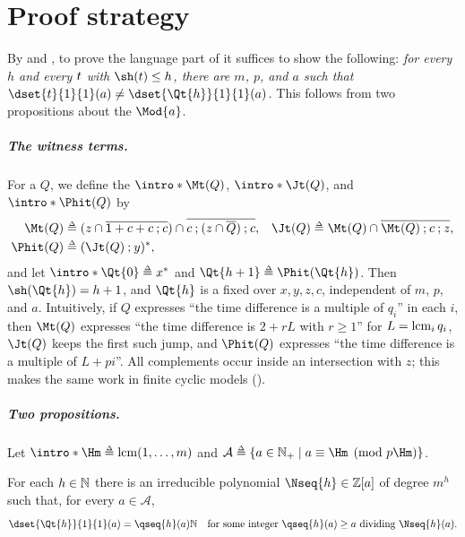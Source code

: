 \section{Proof strategy}\label{section: strategy}

By  and , to prove the language part of  it suffices to show the following:
\emph{for every $h$ and every  $\term$ with $\sh(\term) \le h$, there are $m$, $p$, and $a$ such that $\dset{\term}{1}{1}(a) \neq \dset{\Qt{h}}{1}{1}(a)$.}
This follows from two propositions about the  $\Mod{a}$.

\subparagraph*{The witness terms.}
\AP For a  $Q$, we define the  $\intro*\Mt(Q)$, $\intro*\Jt(Q)$, and $\intro*\Phit(Q)$ by
\begin{align*}
    \Mt(Q) &\defeq (\Zthree) \inter \com{c \compo (z \inter \com{Q}) \compo c}, &
    \Jt(Q) &\defeq \Mt(Q) \inter \com{\Mt(Q) \compo c \compo z}, \\
    \Phit(Q) &\defeq (\Jt(Q) \compo y)^{*},
\end{align*}
\AP and let $\intro*\Qt{0} \defeq x^{*}$ and $\Qt{h+1} \defeq \Phit(\Qt{h})$.
Then $\sh(\Qt{h}) = h + 1$, and $\Qt{h}$ is a fixed  over $x, y, z, c$, independent of $m$, $p$, and $a$.
Intuitively, if $Q$ expresses ``the time difference is a multiple of $q_i$'' in each  $i$, then $\Mt(Q)$ expresses ``the time difference is $2 + rL$ with $r \ge 1$'' for $L = \operatorname{lcm}_i q_i$, $\Jt(Q)$ keeps the first such jump, and $\Phit(Q)$ expresses ``the time difference is a multiple of $L + p i$''.
All complements occur inside an intersection with $z$; this makes the same  work in finite cyclic models ().

\subparagraph*{Two propositions.}
\AP Let $\intro*\Hm \defeq \lcm(1, \dots, m)$ and $\mathcal{A} \defeq \set{a \in \pnat \mid a \equiv \Hm \pmod{p \Hm}}$.

\begin{proposition}\label{proposition: witness}
    For each $h \in \mathbb{N}$ there is an irreducible polynomial $\Nseq{h} \in \inte[a]$ of degree $m^{h}$ such that, for every $a \in \mathcal{A}$,
    \[\dset{\Qt{h}}{1}{1}(a) = \qseq{h}(a) \nat \quad\text{for some integer } \qseq{h}(a) \ge a \text{ dividing } \Nseq{h}(a).\]
\end{proposition}


